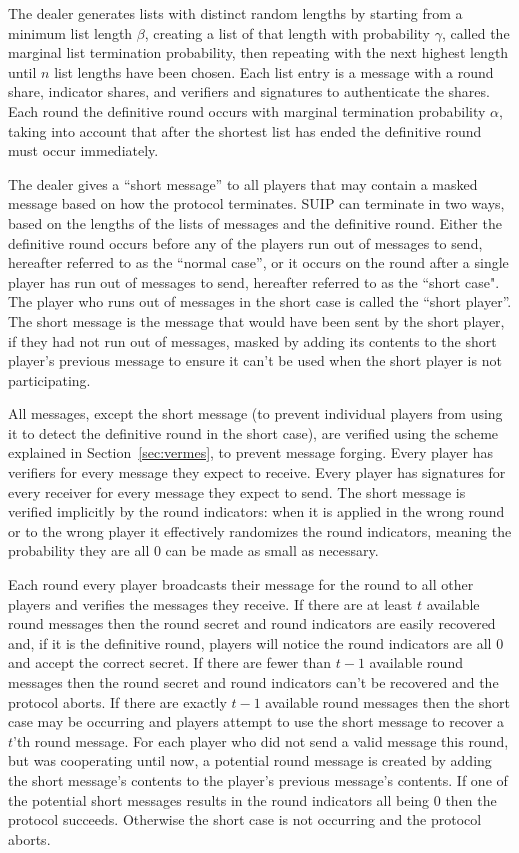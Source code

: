 \documentclass[12pt]{dalcsthesis}
\begin{document}
The dealer generates lists with distinct random lengths by starting from a minimum list length $\beta$, creating a list of that length with probability $\gamma$, called the marginal list termination probability, then repeating with the next highest length until $n$ list lengths have been chosen. Each list entry is a message with a round share, indicator shares, and verifiers and signatures to authenticate the shares. Each round the definitive round occurs with marginal termination probability $\alpha$, taking into account that after the shortest list has ended the definitive round must occur immediately.

The dealer gives a ``short message'' to all players that may contain a masked message based on how the protocol terminates. SUIP can terminate in two ways, based on the lengths of the lists of messages and the definitive round. Either the definitive round occurs before any of the players run out of messages to send, hereafter referred to as the ``normal case'', or it occurs on the round after a single player has run out of messages to send, hereafter referred to as the ``short case". The player who runs out of messages in the short case is called the ``short player''. The short message is the message that would have been sent by the short player, if they had not run out of messages, masked by adding its contents to the short player's previous message to ensure it can't be used when the short player is not participating.

All messages, except the short message (to prevent individual players from using it to detect the definitive round in the short case), are verified using the scheme explained in Section~\ref{sec:vermes}, to prevent message forging. Every player has verifiers for every message they expect to receive. Every player has signatures for every receiver for every message they expect to send. The short message is verified implicitly by the round indicators: when it is applied in the wrong round or to the wrong player it effectively randomizes the round indicators, meaning the probability they are all 0 can be made as small as necessary.

Each round every player broadcasts their message for the round to all other players and verifies the messages they receive. If there are at least $t$ available round messages then the round secret and round indicators are easily recovered and, if it is the definitive round, players will notice the round indicators are all $0$ and accept the correct secret. If there are fewer than $t-1$ available round messages then the round secret and round indicators can't be recovered and the protocol aborts. If there are exactly $t-1$ available round messages then the short case may be occurring and players attempt to use the short message to recover a $t$'th round message. For each player who did not send a valid message this round, but was cooperating until now, a potential round message is created by adding the short message's contents to the player's previous message's contents. If one of the potential short messages results in the round indicators all being 0 then the protocol succeeds. Otherwise the short case is not occurring and the protocol aborts.
\end{document}
